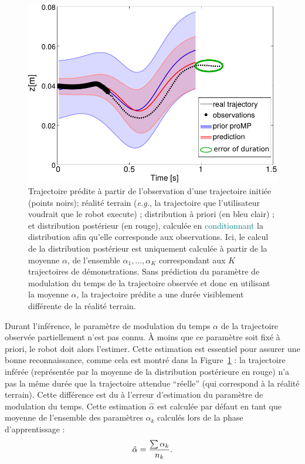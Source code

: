 \documentclass[utf8]{frontiersSCNS} %
\newcommand{\toimprove}[1]{\textcolor{teal}{#1}}
\newcommand{\todo}[1]{\textcolor{red}{\textbf{/*#1*/}}}
\begin{document}
\begin{figure}[h!]
\centering
\includegraphics[width=13cm]{img/mean_alpha_errV2.pdf}
\caption{Trajectoire prédite à partir de l'observation d'une trajectoire initiée (points noirs); réalité terrain (\textit{e.g.}, la trajectoire que l'utilisateur voudrait que le robot execute) ; distribution à priori (en bleu clair) ; et distribution postérieur (en rouge), calculée en \toimprove{conditionnant} la distribution afin qu'elle corresponde aux observations. Ici, le calcul de la distribution postérieur est uniquement calculée à partir de la moyenne $\alpha$, de l'ensemble $\alpha_1, \ldots, \alpha_K$ correspondant aux $K$ trajectoires de démonstrations. Sans prédiction du paramètre de modulation du temps de la trajectoire observée et donc en utilisant la moyenne $\alpha$, la trajectoire prédite a une durée visiblement différente de la réalité terrain.}

\label{fig:moyenneAlpha}
\end{figure}

Durant l'inférence, le paramètre de modulation du temps $\alpha$ de la trajectoire observée partiellement n'est pas connu. À moins que ce paramètre soit fixé à priori, le robot doit alors l'estimer. Cette estimation est essentiel pour assurer une bonne reconnaissance, comme cela est montré dans la Figure~\ref{fig:moyenneAlpha} : la trajectoire inférée (représentée par la moyenne de la distribution postérieure en rouge) 
n'a pas la même durée que la trajectoire attendue ``réelle'' (qui correspond à la réalité terrain). Cette différence est du à l'erreur d'estimation du paramètre de modulation du temps. Cette estimation $\hat{\alpha}$  est calculée par défaut en tant que moyenne de l'ensemble des paramètres $\alpha_k$ calculés lors de la phase d'apprentissage :
\begin{equation}
\label{eq:avg}
\hat{\alpha} = {{\sum \alpha_k} \over n_k} .
\end{equation}
\end{document}
